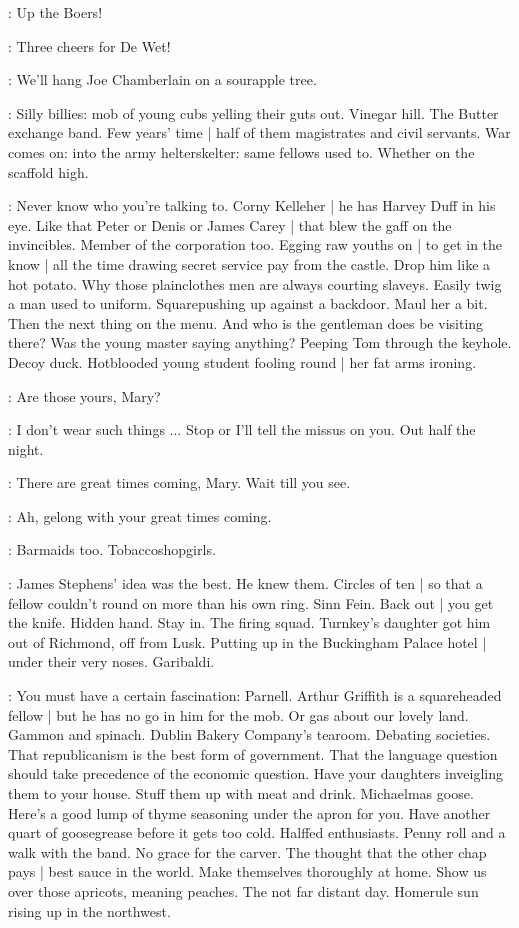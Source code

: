 :
Up the Boers!

:
Three cheers for De Wet!

:
We'll hang Joe Chamberlain on a sourapple tree.

\BloomInt:
Silly billies:
mob of young cubs yelling their guts out.
Vinegar hill.
The Butter exchange band.
Few years' time |
half of them magistrates and civil servants.
War comes on:
into the army helterskelter:
same fellows used to.
Whether on the scaffold high.

\BloomInt:
Never know who you're talking to.
Corny Kelleher |
he has Harvey Duff in his eye.
Like that Peter or Denis or James Carey |
that blew the gaff on the invincibles.
Member of the corporation too.
Egging raw youths on |
to get in the know |
all the time drawing secret service pay from the castle.
Drop him like a hot potato.
Why those plainclothes men are always courting slaveys.
Easily twig a man used to uniform.
Squarepushing up
against a backdoor.
Maul her a bit.
Then the next thing on the menu.
And who is the gentleman does be visiting there?
Was the young master saying anything?
Peeping Tom through the keyhole.
Decoy duck.
Hotblooded young student fooling round |
her fat arms ironing.

\policeman:
Are those yours,
Mary?

\mary:
I don't wear such things ...
Stop or I'll tell the missus on you.
Out half the night.

\policeman:
There are great times coming,
Mary.
Wait till you see.

\mary:
Ah,
gelong with your great times coming.

\BloomInt:
Barmaids too.
Tobaccoshopgirls.

\BloomInt:
James Stephens' idea was the best.
He knew them.
Circles of ten |
so that a fellow couldn't round on more than his own ring.
Sinn Fein.
Back out |
you get the knife.
Hidden hand.
Stay in.
The firing squad.
Turnkey's daughter got him out of Richmond,
off from Lusk.
Putting up in the Buckingham Palace hotel |
under their very noses.
Garibaldi.

\BloomInt:
You must have a certain fascination:
Parnell.
Arthur Griffith is a squareheaded fellow |
but he has no go in him for the mob.
Or gas about our lovely land.
Gammon and spinach.
Dublin Bakery Company's tearoom.
Debating societies.
That republicanism is the best form of government.
That the language question should take precedence of the economic question.
Have your daughters inveigling them to your house.
Stuff them up with meat and drink.
Michaelmas goose.
Here's a good lump of thyme seasoning under the apron for you.
Have another quart of goosegrease before it gets too cold.
Half\/fed enthusiasts.
Penny roll and a walk with the band.
No grace for the carver.
The thought that the other chap pays |
best sauce in the world.
Make themselves thoroughly at home.
Show us over those apricots,
meaning peaches.
The not far distant day.
Homerule sun rising up in the northwest.

